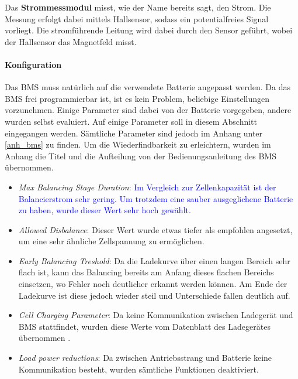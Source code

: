 Das \textbf{Strommessmodul} misst, wie der Name bereits sagt, den Strom. Die Messung erfolgt dabei mittels Hallsensor, sodass ein potentialfreies Signal vorliegt. Die stromführende Leitung wird dabei durch den Sensor geführt, wobei der Hallsensor das Magnetfeld misst.

\paragraph{Konfiguration}
Das BMS muss natürlich auf die verwendete Batterie angepasst werden. Da das BMS frei programmierbar ist, ist es kein Problem, beliebige Einstellungen vorzunehmen. Einige Parameter sind dabei von der Batterie vorgegeben, andere wurden selbst evaluiert. Auf einige Parameter soll in diesem Abschnitt eingegangen werden. Sämtliche Parameter sind jedoch im Anhang unter \ref{anh_bms} zu finden. Um die Wiederfindbarkeit zu erleichtern, wurden im Anhang die Titel und die Aufteilung von der Bedienungsanleitung des BMS \cite{bms} übernommen. \begin{itemize}
	\item \textit{Max Balancing Stage Duration}: \textcolor{blue}{Im Vergleich zur Zellenkapazität ist der Balancierstrom sehr gering. Um trotzdem eine sauber ausgeglichene Batterie zu haben, wurde dieser Wert sehr hoch gewählt.}
	\item \textit{Allowed Disbalance}: Dieser Wert wurde etwas tiefer als empfohlen angesetzt, um eine sehr ähnliche Zellspannung zu ermöglichen.
	\item \textit{Early Balancing Treshold}: Da die Ladekurve über einen langen Bereich sehr flach ist, kann das Balancing bereits am Anfang dieses flachen Bereichs einsetzen, wo Fehler noch deutlicher erkannt werden können. Am Ende der Ladekurve ist diese jedoch wieder steil und Unterschiede fallen deutlich auf.
	\item \textit{Cell Charging Parameter}: Da keine Kommunikation zwischen Ladegerät und BMS stattfindet, wurden diese Werte vom Datenblatt des Ladegerätes übernommen \cite{ladegeraet}.
	\item \textit{Load power reductions}: Da zwischen Antriebsstrang und Batterie keine Kommunikation besteht, wurden sämtliche Funktionen deaktiviert.
\end{itemize}